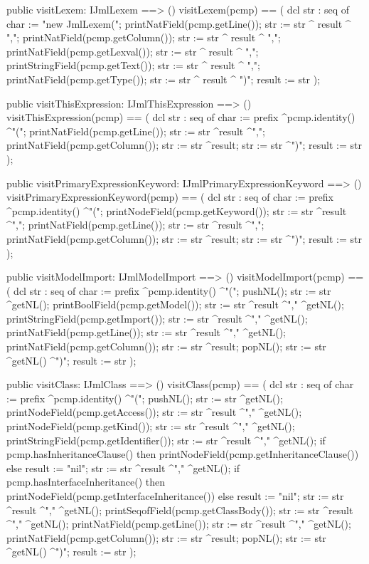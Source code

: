 \begin{vdm_al}
  public visitLexem: IJmlLexem ==> ()
  visitLexem(pcmp) ==
    ( dcl str : seq of char := "new JmlLexem(";
      printNatField(pcmp.getLine());
      str := str ^ result ^ ",";
      printNatField(pcmp.getColumn());
      str := str ^ result ^ ",";
      printNatField(pcmp.getLexval());
      str := str ^ result ^ ",";
      printStringField(pcmp.getText());
      str := str ^ result ^ ",";
      printNatField(pcmp.getType());
      str := str ^ result ^ ")";
      result := str );

  public visitThisExpression: IJmlThisExpression ==> ()
  visitThisExpression(pcmp) ==
    ( dcl str : seq of char := prefix ^pcmp.identity() ^"(";
      printNatField(pcmp.getLine());
      str := str ^result ^",";
      printNatField(pcmp.getColumn());
      str := str ^result;
      str := str ^")";
      result := str );

  public visitPrimaryExpressionKeyword: IJmlPrimaryExpressionKeyword ==> ()
  visitPrimaryExpressionKeyword(pcmp) ==
    ( dcl str : seq of char := prefix ^pcmp.identity() ^"(";
      printNodeField(pcmp.getKeyword());
      str := str ^result ^",";
      printNatField(pcmp.getLine());
      str := str ^result ^",";
      printNatField(pcmp.getColumn());
      str := str ^result;
      str := str ^")";
      result := str );

  public visitModelImport: IJmlModelImport ==> ()
  visitModelImport(pcmp) ==
    ( dcl str : seq of char := prefix ^pcmp.identity() ^"(";
      pushNL();
      str := str ^getNL();
      printBoolField(pcmp.getModel());
      str := str ^result ^"," ^getNL();
      printStringField(pcmp.getImport());
      str := str ^result ^"," ^getNL();
      printNatField(pcmp.getLine());
      str := str ^result ^"," ^getNL();
      printNatField(pcmp.getColumn());
      str := str ^result;
      popNL();
      str := str ^getNL() ^")";
      result := str );

  public visitClass: IJmlClass ==> ()
  visitClass(pcmp) ==
    ( dcl str : seq of char := prefix ^pcmp.identity() ^"(";
      pushNL();
      str := str ^getNL();
      printNodeField(pcmp.getAccess());
      str := str ^result ^"," ^getNL();
      printNodeField(pcmp.getKind());
      str := str ^result ^"," ^getNL();
      printStringField(pcmp.getIdentifier());
      str := str ^result ^"," ^getNL();
      if pcmp.hasInheritanceClause()
      then printNodeField(pcmp.getInheritanceClause())
      else result := "nil";
      str := str ^result ^"," ^getNL();
      if pcmp.hasInterfaceInheritance()
      then printNodeField(pcmp.getInterfaceInheritance())
      else result := "nil";
      str := str ^result ^"," ^getNL();
      printSeqofField(pcmp.getClassBody());
      str := str ^result ^"," ^getNL();
      printNatField(pcmp.getLine());
      str := str ^result ^"," ^getNL();
      printNatField(pcmp.getColumn());
      str := str ^result;
      popNL();
      str := str ^getNL() ^")";
      result := str );


\end{vdm_al}

